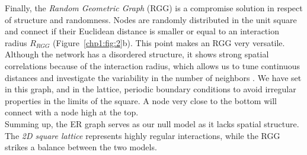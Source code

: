 Finally, the \textit{Random Geometric Graph} (RGG) \cite{Dall2002RandomGraphs} is a compromise solution in respect of structure and randomness. Nodes are randomly distributed in the unit square and connect if their Euclidean distance is smaller or equal to an interaction radius $R_{RGG}$ (Figure~\ref{chp1:fig:2}b). This point makes an RGG very versatile. Although the network has a disordered structure, it shows strong spatial correlations because of the interaction radius, which allows us to tune continuous distances and investigate the variability in the number of neighbors \cite{cardillo2012,estrada2016,arias2018}.  We have set in this graph, and in the lattice, periodic boundary conditions to avoid irregular properties in the limits of the square. A node very close to the bottom will connect with a node high at the top. \\

Summing up, the ER graph serves as our null model as it lacks spatial structure. The \textit{2D square lattice} represents highly regular interactions, while the RGG strikes a balance between the two models. \\

